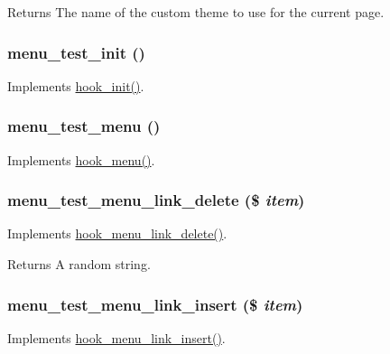 \begin{DoxyReturn}{Returns}
The name of the custom theme to use for the current page. 
\end{DoxyReturn}
\hypertarget{menu__test_8module_afd276ac2b708dea9c270dc3fd3a563a2}{
\subsubsection[{menu\_\-test\_\-init}]{\setlength{\rightskip}{0pt plus 5cm}menu\_\-test\_\-init ()}}
\label{menu__test_8module_afd276ac2b708dea9c270dc3fd3a563a2}
Implements \hyperlink{group__hooks_ga74edef0c463436fdbb1f92ef367db051}{hook\_\-init()}. \hypertarget{menu__test_8module_a47bbb5dc373947cf8998c11eeb0efa2b}{
\subsubsection[{menu\_\-test\_\-menu}]{\setlength{\rightskip}{0pt plus 5cm}menu\_\-test\_\-menu ()}}
\label{menu__test_8module_a47bbb5dc373947cf8998c11eeb0efa2b}
Implements \hyperlink{group__hooks_ga5c95244fea59b25666e409759e133ded}{hook\_\-menu()}. \hypertarget{menu__test_8module_a823b79bcf475ef99b7d69cd5627bbe5a}{
\subsubsection[{menu\_\-test\_\-menu\_\-link\_\-delete}]{\setlength{\rightskip}{0pt plus 5cm}menu\_\-test\_\-menu\_\-link\_\-delete (\$ {\em item})}}
\label{menu__test_8module_a823b79bcf475ef99b7d69cd5627bbe5a}
Implements \hyperlink{group__hooks_gaf08037b21bd31aa8d2b12e988da7e2fb}{hook\_\-menu\_\-link\_\-delete()}.

\begin{DoxyReturn}{Returns}
A random string. 
\end{DoxyReturn}
\hypertarget{menu__test_8module_a799c5f289e6f6b334fe012ba03273c93}{
\subsubsection[{menu\_\-test\_\-menu\_\-link\_\-insert}]{\setlength{\rightskip}{0pt plus 5cm}menu\_\-test\_\-menu\_\-link\_\-insert (\$ {\em item})}}
\label{menu__test_8module_a799c5f289e6f6b334fe012ba03273c93}
Implements \hyperlink{group__hooks_ga834a576b88ca7a08ce1244469fabb116}{hook\_\-menu\_\-link\_\-insert()}.

